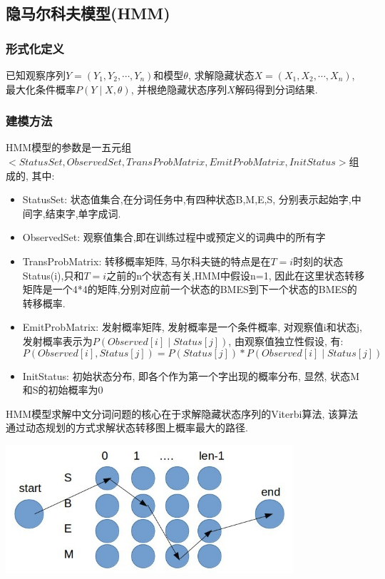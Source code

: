 \documentclass[titlepage]{article}
\begin{document}
\subsection{隐马尔科夫模型(HMM)}

\subsubsection{形式化定义}
已知观察序列$Y = (Y_1, Y_2, \cdots, Y_n)$和模型$\theta$, 求解隐藏状态$X = (X_1, X_2, \cdots, X_n)$, 最大化条件概率$P(Y \mathrel| X, \theta)$, 并根绝隐藏状态序列$X$解码得到分词结果.
\subsubsection{建模方法}
HMM模型的参数是一五元组$<StatusSet, ObservedSet, TransProbMatrix, EmitProbMatrix, InitStatus>$组成的, 其中:
\begin{itemize}
    \item StatusSet: 状态值集合,在分词任务中,有四种状态B,M,E,S, 分别表示起始字,中间字,结束字,单字成词.
    \item ObservedSet: 观察值集合,即在训练过程中或预定义的词典中的所有字 
    \item TransProbMatrix: 转移概率矩阵, 马尔科夫链的特点是在$T=i$时刻的状态Status(i),只和$T=i$之前的n个状态有关,HMM中假设n=1, 因此在这里状态转移矩阵是一个4*4的矩阵,分别对应前一个状态的BMES到下一个状态的BMES的转移概率.
    \item EmitProbMatrix: 发射概率矩阵, 发射概率是一个条件概率, 对观察值i和状态j, 发射概率表示为$P(Observed[i]\mathrel|Status[j])$, 由观察值独立性假设, 有:
$$
P(Observed[i], Status[j]) = P(Status[j]) * P(Observed[i]\mathrel|Status[j])
$$
    \item InitStatus: 初始状态分布, 即各个作为第一个字出现的概率分布, 显然, 状态M和S的初始概率为0
\end{itemize}
HMM模型求解中文分词问题的核心在于求解隐藏状态序列的Viterbi\cite{viterbi}算法, 该算法通过动态规划的方式求解状态转移图上概率最大的路径.

\includegraphics[width=0.8\textwidth]{viterbi.png}
\end{document}

